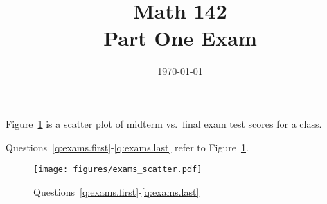 \documentclass[letterpaper]{exam}
\title{Math 142 \\ Part One Exam}
\date{\today}
\author{}
\begin{document}
  \maketitle



  Figure~\ref{fig:exams} is a scatter plot of midterm vs.\ final exam test scores
  for a class.

  Questions~\ref{q:exams.first}-\ref{q:exams.last} refer to Figure~\ref{fig:exams}.  

  \begin{figure}[H]
    \centering
    \texttt{[image: figures/exams\_scatter.pdf]}
    \caption{Questions~\ref{q:exams.first}-\ref{q:exams.last}}\label{fig:exams}
  \end{figure}
\end{document}
